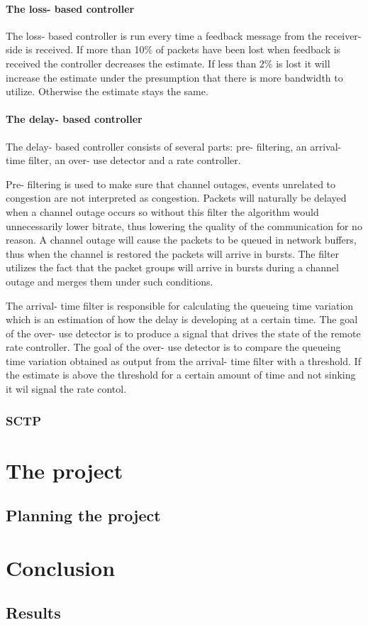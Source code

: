 \documentclass[UKenglish]{ifimaster}  %
\begin{document}
\subsection{The loss- based controller}
The loss- based controller is run every time a feedback message from the receiver- side is received. 
If more than 10\% of packets have been lost when feedback is received the controller decreases the estimate. 
If less than 2\% is lost it will increase the estimate under the presumption that there is more bandwidth to utilize. 
Otherwise the estimate stays the same.
\subsection{The delay- based controller}
 The delay- based controller consists of several parts: pre- filtering, an arrival- time filter, an over- use detector and a rate controller. %

 Pre- filtering is used to make sure that channel outages, events unrelated to congestion are not interpreted as congestion.
Packets will naturally be delayed when a channel outage occurs so without this filter the algorithm would unnecessarily lower bitrate, thus lowering the quality of the communication for no reason.
A channel outage will cause the packets to be queued in network buffers, thus when the channel is restored the packets will arrive in bursts. 
The filter utilizes the fact that the packet groups will arrive in bursts during a channel outage and merges them under such conditions.

The arrival- time filter is responsible for calculating the queueing time variation which is an estimation of how the delay is developing at a certain time.
The goal of the over- use detector is to produce a signal that drives the state of the remote rate controller. 
The goal of the over- use detector is to compare the queueing time variation obtained as output from the arrival- time filter with a threshold. If the estimate is above the threshold for a certain amount of time and not sinking it wil signal the rate contol.

\section{SCTP}
\part{The project}                    %

\chapter{Planning the project}        %


\part{Conclusion}                     %

\chapter{Results}                     %


\backmatter{}
\printbibliography
\end{document}
